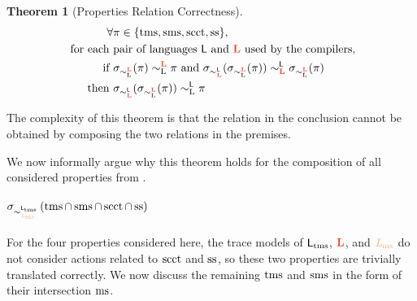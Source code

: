 \documentclass[acmsmall]{acmart}
\theoremstyle{definition}
\newtheorem{theorem}{Theorem}[section]
\begin{document}
\begin{theorem}[Properties Relation Correctness]\label{thm:prop-rel-corr}
  \begin{align*}
    \forall& \pi \in \{\tmssafe,\smssafe,\scctsafe,\sssafe\}, 
    \\
    \text{ for each }& \text{pair of languages } \src{L} \text{ and } \trg{L} \text{ used by the compilers},
    \\
    \text{ if }& 
    \sigma_{\sim^{\trg{L}}_{\ev{L}}}(\pi) \sim^{\trg{L}}_{\ev{L}} \pi
    \text{ and } 
    \sigma_{\sim^{\src{L}}_{\trg{L}}}(\sigma_{\sim^{\trg{L}}_{\ev{L}}}(\pi)) \sim^{\src{L}}_{\trg{L}} \sigma_{\sim^{\trg{L}}_{\ev{L}}}(\pi)
    \\
    \text{ then }& 
    \sigma_{\sim^{\src{L}}_{\trg{L}}}(\sigma_{\sim^{\trg{L}}_{\ev{L}}}(\pi)) \sim^{\src{L}}_{\ev{L}} \pi
  \end{align*}
\end{theorem}
The complexity of this theorem is that the relation in the conclusion cannot be obtained by composing the two relations in the premises.
% 
% 

We now informally argue why this theorem holds for the composition of all considered properties from .

\paragraph{$\sigma_{\sim^{\Ltms}_{\Lms}}\left(\tmssafe\cap\smssafe\cap\scctsafe\cap\sssafe\right)$}

For the four properties considered here, the trace models of $\mathsf{L_{\operatorname{tms}}}$, $\Ltrg$, and $\Lms$ do not consider actions related to $\operatorname{scct}$ and $\operatorname{ss}$, so these two properties are trivially translated correctly.
% 
We now discuss the remaining $\operatorname{tms}$ and $\operatorname{sms}$ in the form of their intersection $\operatorname{ms}$.
\end{document}
